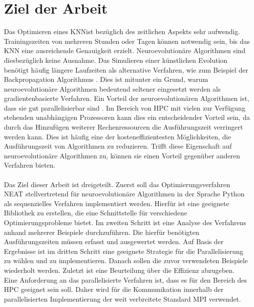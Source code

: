 \section{Ziel der Arbeit}
Das Optimieren eines \ac{KNN}ist bezüglich des zeitlichen Aspekts sehr aufwendig. Trainingszeiten von mehreren Stunden oder Tagen können notwendig sein, bis das \ac{KNN} eine ausreichende Genauigkeit erzielt. Neuroevolutionäre Algorithmen sind diesbezüglich keine Ausnahme. Das Simulieren einer künstlichen Evolution benötigt häufig längere Laufzeiten als alternative Verfahren, wie zum Beispiel der Backpropagation Algorithmus \cite{whitley1993genetic}. Dies ist mitunter ein Grund, warum neuroevolutionäre Algorithmen bedeutend seltener eingesetzt werden als gradientenbasierte Verfahren. Ein Vorteil der neuroevolutionären Algorithmen ist, dass sie gut parallelisierbar sind \cite{such2017deep}. Im Bereich von \ac{HPC} mit vielen zur Verfügung stehenden unabhängigen Prozessoren kann dies ein entscheidender Vorteil sein, da durch das Hinzufügen weiterer Rechenressourcen die Ausführungszeit verringert werden kann. Dies ist häufig eine der kosteneffizientesten Möglichkeiten, die Ausführungszeit von Algorithmen zu reduzieren. Trifft diese Eigenschaft auf neuroevolutionäre Algorithmen zu, können sie einen Vorteil gegenüber anderen Verfahren bieten.
\\\\
Das Ziel dieser Arbeit ist dreigeteilt. Zuerst soll das Optimierungsverfahren \ac{NEAT} stellvertretend für neuroevolutionäre Algorithmen in der Sprache Python als sequenzielles Verfahren implementiert werden. Hierfür ist eine geeignete Bibliothek zu erstellen, die eine Schnittstelle für verschiedene Optimierungsprobleme bietet. Im zweiten Schritt ist eine Analyse des Verfahrens anhand mehrerer Beispiele durchzuführen. Die hierfür benötigten Ausführungszeiten müssen erfasst und ausgewertet werden. Auf Basis der Ergebnisse ist im dritten Schritt eine geeignete Strategie für die Parallelisierung zu wählen und zu implementieren. Danach sollen die zuvor verwendeten Beispiele wiederholt werden. Zuletzt ist eine Beurteilung über die Effizienz abzugeben. Eine Anforderung an das parallelisierte Verfahren ist, dass es für den Bereich des \ac{HPC} geeignet sein soll. Daher wird für die Kommunikation innerhalb der parallelisierten Implementierung der weit verbreitete Standard \ac{MPI} verwendet. 



